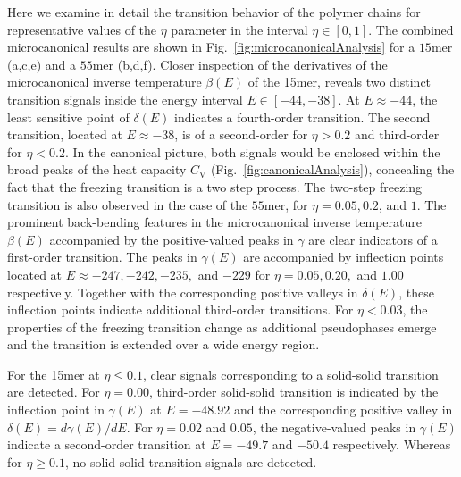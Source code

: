 \documentclass[12pt]{report}
\begin{document}
Here we examine in detail the transition behavior of the polymer chains for representative values of the $\eta$ parameter in the interval $\eta\in[0,1]$. The combined microcanonical results are shown in Fig.~\ref{fig:microcanonicalAnalysis} for a $15$mer (a,c,e) and a $55$mer (b,d,f). Closer inspection of the derivatives of the microcanonical inverse temperature $\beta(E)$ of the 15mer, reveals two distinct transition signals inside the energy interval $E\in[-44,-38]$. At $E\approx -44$, the least sensitive point of $\delta(E)$ indicates a fourth-order transition. The second transition, located at $E\approx -38$, is of a second-order for $\eta > 0.2$ and third-order for $\eta < 0.2$. In the canonical picture, both signals would be enclosed within the broad peaks of the heat capacity $C_{\mathrm{V}}$ (Fig.~\ref{fig:canonicalAnalysis}), concealing the fact that the freezing transition is a two step process. The two-step freezing transition is also observed in the case of the $55$mer, for $\eta=0.05, 0.2$, and $1$. The prominent back-bending features in the microcanonical inverse temperature $\beta(E)$ accompanied by the positive-valued peaks in $\gamma$ are clear indicators of a first-order transition. The peaks in $\gamma(E)$ are accompanied by inflection points located at $E \approx -247, -242, -235,$ and $-229$ for $\eta= 0.05, 0.20,$ and $1.00$ respectively. Together with the corresponding positive valleys in $\delta(E)$, these inflection points indicate additional third-order transitions. For $\eta < 0.03$, the properties of the freezing transition change as additional pseudophases emerge and the transition is extended over a wide energy region. 

For the 15mer at $\eta \leq 0.1$, clear signals corresponding to a solid-solid transition are detected. For $\eta=0.00$, third-order solid-solid transition is indicated by the inflection point in $\gamma(E)$ at $E=-48.92$ and the corresponding positive valley in $\delta(E)=d \gamma(E)/d E$. For $\eta=0.02$ and $0.05$, the negative-valued peaks in $\gamma(E)$ indicate a second-order transition at $E=-49.7$ and $-50.4$ respectively. Whereas for $\eta \geq 0.1$, no solid-solid transition signals are detected.
\end{document}
